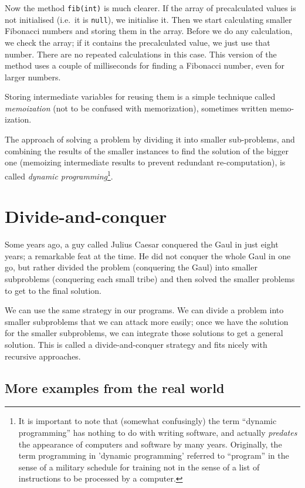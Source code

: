 Now the method \verb+fib(int)+ is much clearer. If the array of
precalculated values is not initialised (i.e.~it is \verb+null+), we
initialise it. Then we start calculating smaller Fibonacci numbers and
storing them in the array. Before we do any calculation, we check the
array; if it contains the precalculated value, we just use that
number. There are no repeated calculations in this case. This version of the
method uses a couple of milliseconds for finding a Fibonacci number,
even for larger numbers. 

Storing intermediate variables for reusing them is a simple technique
called \emph{memoization} (not to be confused with memorization),
sometimes written memo-ization. 

The approach of solving a problem by dividing it into smaller
sub-problems, and combining the results of the smaller instances to
find the solution of the bigger one (memoizing intermediate results to
prevent redundant re-computation), is called \emph{dynamic
  programming}\footnote{It is important to note that (somewhat
  confusingly) the term ``dynamic programming'' has nothing to do with
  writing software, and actually \emph{predates} the appearance of
  computers and software by many years. 
  Originally, the term programming in 'dynamic programming'
  referred to ``program'' in the sense of a military schedule for
  training not in the sense of a list of instructions to be processed
  by a computer.}.

\section{Divide-and-conquer}
\label{sec:divide-conquer}

Some years ago, a guy called Julius Caesar conquered the Gaul in just
eight years; a remarkable feat at the time. He did not conquer the
whole Gaul in one go, but rather divided the problem (conquering the
Gaul) into smaller subproblems (conquering each small tribe) and then
solved the smaller problems to get to the final solution. 

We can use the same strategy in our programs. We can divide a problem
into smaller subproblems that we can attack more easily; once we have
the solution for the smaller subproblems, we can integrate those
solutions to get a general solution. This is called a
divide-and-conquer strategy and fits nicely with recursive
approaches. 

\subsection{More examples from the real world}
\label{sec:an-example-from}

